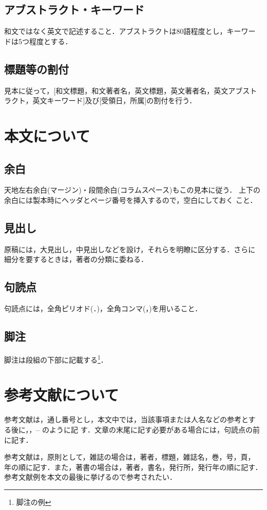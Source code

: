 \documentclass[a4j, 12Q, twocolumn, twoside]{jsarticle}
\begin{document}
\subsection{アブストラクト・キーワード}
和文ではなく英文で記述すること．アブストラクトは80語程度とし，キーワー
ドは5つ程度とする．

\subsection{標題等の割付}
見本に従って，[和文標題，和文著者名，英文標題，英文著者名，英文アブスト
ラクト，英文キーワード]及び[受領日，所属]の割付を行う．

\section{本文について}

\subsection{余白}
天地左右余白(マージン)・段間余白(コラムスペース)もこの見本に従う．
上下の余白には製本時にヘッダとページ番号を挿入するので，空白にしておく
こと．

\subsection{見出し}
原稿には，大見出し，中見出しなどを設け，それらを明瞭に区分する．さらに
細分を要するときは，著者の分類に委ねる．

\subsection{句読点}
句読点には，全角ピリオド(．)，全角コンマ(，)を用いること．

\subsection{脚注}
脚注は段組の下部に記載する\footnote{脚注の例}．

\section{参考文献について}
参考文献は，通し番号とし，本文中では，当該事項または人名などの参考とす
る後に，\cite{TRA96HuHaCo}，\cite{SICE02Yo}--\cite{Asa02Ar} のように記
す．文章の末尾に記す必要がある場合には，句読点の前に記す．

参考文献は，原則として，雑誌の場合は，著者，標題，雑誌名，巻，号，頁，
年の順に記す．また，著書の場合は，著者，書名，発行所，発行年の順に記す．
参考文献例を本文の最後に挙げるので参考されたい．
\end{document}
